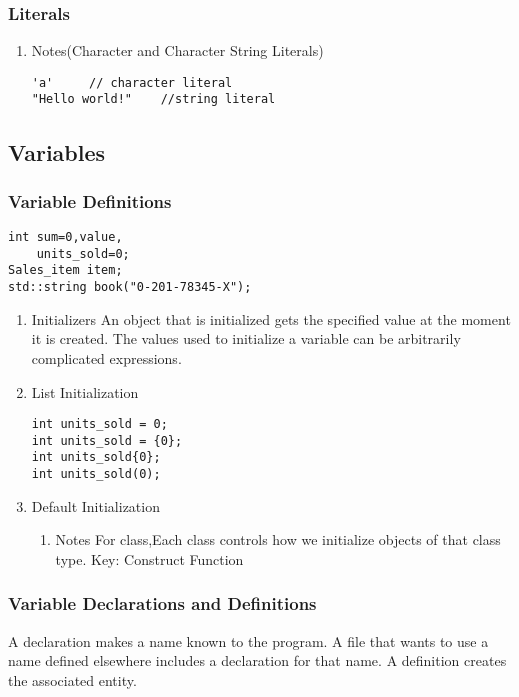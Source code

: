 \documentclass[11pt]{article}
\begin{document}
\subsubsection{Literals}
\label{sec-2-1-2}
\begin{enumerate}
\item Notes(Character and Character String Literals)
\label{sec-2-1-2-1}
\begin{verbatim}
'a'     // character literal
"Hello world!"    //string literal
\end{verbatim}
\end{enumerate}

\subsection{Variables}
\label{sec-2-2}
\subsubsection{Variable Definitions}
\label{sec-2-2-1}
\begin{verbatim}
int sum=0,value,
    units_sold=0;
Sales_item item;
std::string book("0-201-78345-X");
\end{verbatim}
\begin{enumerate}
\item Initializers
\label{sec-2-2-1-1}
An object that is initialized gets the specified value at the moment it is created. The values used to initialize a variable can be arbitrarily complicated expressions.
\item List Initialization
\label{sec-2-2-1-2}
\begin{verbatim}
int units_sold = 0;
int units_sold = {0};
int units_sold{0}; 
int units_sold(0);
\end{verbatim}
\item Default Initialization
\label{sec-2-2-1-3}
\begin{enumerate}
\item Notes
\label{sec-2-2-1-3-1}
For class,Each class controls how we initialize objects of that class type.
Key: Construct Function
\end{enumerate}
\end{enumerate}
\subsubsection{Variable Declarations and Definitions}
\label{sec-2-2-2}
A declaration makes a name known to the program. A file that wants to use a name defined elsewhere includes a declaration for that name. A definition creates the associated entity.
\end{document}

